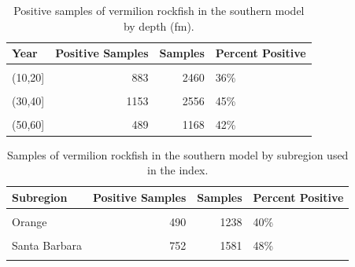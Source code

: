 \documentclass[11pt,
  english,
]{article}
\begin{document}
\begin{table}

\caption{\label{tab:tab-depth-cpfvonboard}Positive samples of vermilion rockfish in the southern model by depth (fm).}
\centering
\begin{tabular}[t]{lrrl}
\toprule
Year & Positive Samples & Samples & Percent Positive\\
\midrule
\cellcolor{gray!6}{(0,10]} & \cellcolor{gray!6}{51} & \cellcolor{gray!6}{665} & \cellcolor{gray!6}{8\%}\\
(10,20] & 883 & 2460 & 36\%\\
\cellcolor{gray!6}{(20,30]} & \cellcolor{gray!6}{1568} & \cellcolor{gray!6}{3313} & \cellcolor{gray!6}{47\%}\\
(30,40] & 1153 & 2556 & 45\%\\
\cellcolor{gray!6}{(40,50]} & \cellcolor{gray!6}{1816} & \cellcolor{gray!6}{4056} & \cellcolor{gray!6}{45\%}\\
\addlinespace
(50,60] & 489 & 1168 & 42\%\\
\bottomrule
\end{tabular}
\end{table}

\FloatBarrier

\begin{table}

\caption{\label{tab:tab-region-cpfvonboard}Samples of vermilion rockfish in the southern model by subregion used in the index.}
\centering
\begin{tabular}[t]{lrrl}
\toprule
Subregion & Positive Samples & Samples & Percent Positive\\
\midrule
\cellcolor{gray!6}{Los Angeles} & \cellcolor{gray!6}{1865} & \cellcolor{gray!6}{4319} & \cellcolor{gray!6}{43\%}\\
Orange & 490 & 1238 & 40\%\\
\cellcolor{gray!6}{San Diego} & \cellcolor{gray!6}{1152} & \cellcolor{gray!6}{2408} & \cellcolor{gray!6}{48\%}\\
Santa Barbara & 752 & 1581 & 48\%\\
\cellcolor{gray!6}{Ventura} & \cellcolor{gray!6}{1701} & \cellcolor{gray!6}{4672} & \cellcolor{gray!6}{36\%}\\
\bottomrule
\end{tabular}
\end{table}

\FloatBarrier
\end{document}
